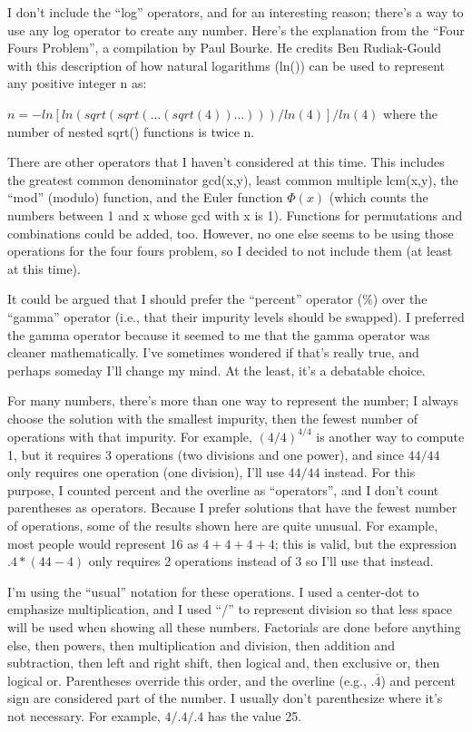 \documentclass[twocolumn,twoside,draft,american]{report}
\begin{document}
I don't include the ``log'' operators, and for an interesting reason;
there's a way to use any log operator to create any number.
Here's the explanation from the ``Four Fours Problem'', a compilation
by Paul Bourke.
He credits Ben Rudiak-Gould with this description of how natural
logarithms (ln()) can be used to represent any positive integer n as:

$n = -ln[ ln( sqrt(sqrt(...(sqrt(4))...))) / ln(4) ] / ln(4)$
where the number of nested sqrt() functions is twice n.

There are other operators that I haven't considered at this time.
This includes the greatest common denominator gcd(x,y),
least common multiple lcm(x,y), the ``mod'' (modulo) function,
and the Euler function $\Phi(x)$ (which counts the numbers between
1 and x whose gcd with x is 1).
Functions for permutations and combinations could be added, too.
However, no one else seems to be using those operations for the four fours
problem, so I decided to not include them (at least at this time).

It could be argued that I should prefer the ``percent'' operator (\%)
over the ``gamma'' operator (i.e., that their impurity levels should be
swapped).
I preferred the gamma operator because it seemed
to me that the gamma operator was cleaner mathematically.
I've sometimes wondered if that's really true, and perhaps
someday I'll change my mind.
At the least, it's a debatable choice.

For many numbers, there's more than one way to represent the number;
I always choose the solution with the
smallest impurity, then the fewest number of operations with that impurity.
For example, $(4/4)^{4/4}$ is another way to compute 1, but it
requires 3 operations (two divisions and one power), and since $44/44$
only requires one operation (one division), I'll use $44/44$ instead.
For this purpose, I counted percent and the overline as ``operators'',
and I don't count parentheses as operators.
Because I prefer solutions that have the fewest number of operations, some
of the results shown here are quite unusual.
For example, most people would represent 16 as $4+4+4+4$; this is valid,
but the expression $.4*(44-4)$ only requires 2 operations instead of 3
so I'll use that instead.

I'm using the ``usual'' notation for these operations.
I used a center-dot to emphasize multiplication, and I used ``/'' to
represent division so that less space will be used when showing all these
numbers.
Factorials are done before anything else,
then powers, then multiplication and division, then
addition and subtraction,
then left and right shift, then logical and,
then exclusive or, then logical or.
Parentheses override this order, and the overline (e.g., $.\overline{4}$)
and percent sign are considered part of the number.
I usually don't parenthesize where it's not necessary.
For example, $4/.4/.4$ has the value 25.
\end{document}
